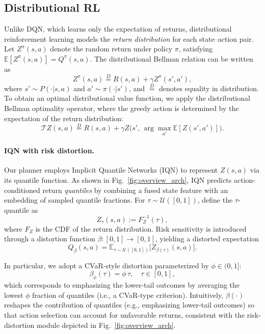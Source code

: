 \subsection{Distributional RL}
\label{sec:method_distRL}
Unlike DQN, which learns only the expectation of returns, distributional reinforcement learning models the \emph{return distribution} for each state--action pair. Let $Z^{\pi}(s,a)$ denote the random return under policy $\pi$, satisfying $\mathbb{E}[Z^{\pi}(s,a)] = Q^{\pi}(s,a)$. The distributional Bellman relation can be written as
\begin{equation}
Z^{\pi}(s,a) \overset{D}{=} R(s,a) + \gamma Z^{\pi}(s',a'),
\label{eq:dist_bellman}
\end{equation}
where $s' \sim P(\cdot|s,a)$ and $a' \sim \pi(\cdot|s')$, and $\overset{D}{=}$ denotes equality in distribution.
To obtain an optimal distributional value function, we apply the distributional Bellman optimality operator, where the greedy action is determined by the expectation of the return distribution:
\begin{equation}
\mathcal{T}Z(s,a) \overset{D}{=} R(s,a) + \gamma Z\!\Big(s',\,\arg\max_{a'} \mathbb{E}[Z(s',a')]\Big).
\label{eq:dist_opt}
\end{equation}

\paragraph{IQN with risk distortion.}
Our planner employs Implicit Quantile Networks (IQN) to represent $Z(s,a)$ via its quantile function. As shown in Fig.~\ref{fig:overview_arch}, IQN predicts action-conditioned return \emph{quantiles} by combining a fused state feature with an embedding of sampled quantile fractions.
For $\tau \sim \mathcal{U}([0,1])$, define the $\tau$-quantile as
\begin{equation}
Z_{\tau}(s,a) := F_Z^{-1}(\tau),
\label{eq:iqn_quantile}
\end{equation}
where $F_Z$ is the CDF of the return distribution. Risk sensitivity is introduced through a distortion function $\beta:[0,1]\rightarrow[0,1]$, yielding a distorted expectation
\begin{equation}
Q_{\beta}(s,a)
=
\mathbb{E}_{\tau \sim \mathcal{U}([0,1])}\Big[ Z_{\beta(\tau)}(s,a)\Big].
\label{eq:distorted_q}
\end{equation}

In particular, we adopt a CVaR-style distortion parameterized by $\phi\in(0,1]$:
\begin{equation}
\beta_{\phi}(\tau) = \phi\,\tau,\quad \tau\in[0,1],
\label{eq:cvar_distortion}
\end{equation}
which corresponds to emphasizing the lower-tail outcomes by averaging the lowest $\phi$ fraction of quantiles (i.e., a CVaR-type criterion). Intuitively, $\beta(\cdot)$ reshapes the contribution of quantiles (e.g., emphasizing lower-tail outcomes) so that action selection can account for unfavorable returns, consistent with the risk-distortion module depicted in Fig.~\ref{fig:overview_arch}.


